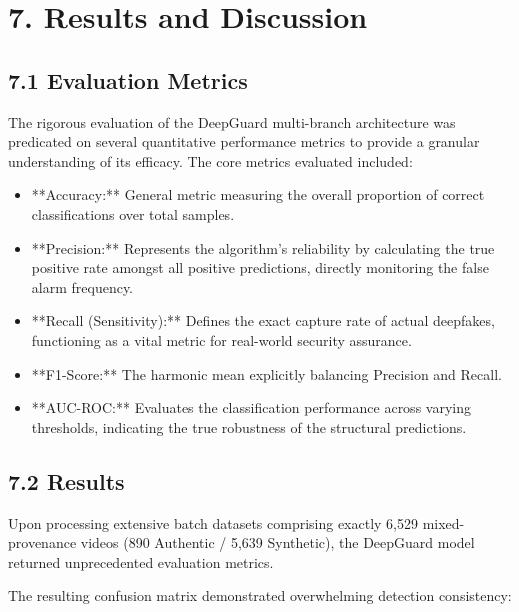 \documentclass[12pt,a4paper]{article}
\begin{document}
\section{7. Results and Discussion}
\subsection{7.1 Evaluation Metrics}
The rigorous evaluation of the DeepGuard multi-branch architecture was predicated on several quantitative performance metrics to provide a granular understanding of its efficacy. The core metrics evaluated included:

\begin{itemize}
\item **Accuracy:** General metric measuring the overall proportion of correct classifications over total samples.
\item **Precision:** Represents the algorithm's reliability by calculating the true positive rate amongst all positive predictions, directly monitoring the false alarm frequency.
\item **Recall (Sensitivity):** Defines the exact capture rate of actual deepfakes, functioning as a vital metric for real-world security assurance.
\item **F1-Score:** The harmonic mean explicitly balancing Precision and Recall.
\item **AUC-ROC:** Evaluates the classification performance across varying thresholds, indicating the true robustness of the structural predictions.
\end{itemize}
\subsection{7.2 Results}
Upon processing extensive batch datasets comprising exactly 6,529 mixed-provenance videos (890 Authentic / 5,639 Synthetic), the DeepGuard model returned unprecedented evaluation metrics.

The resulting confusion matrix demonstrated overwhelming detection consistency:
\end{document}
